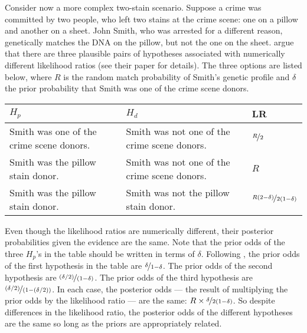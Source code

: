 \documentclass{article}
\begin{document}
Consider now a more complex two-stain scenario. Suppose a crime was committed by two people, who left two stains at the crime scene: one on a pillow and another on a sheet. John Smith, who was arrested for a different reason, genetically matches the DNA on the pillow, but not the one on the sheet. %
\cite{meester2004WhyEffectPriora} argue that there are  three plausible pairs of hypotheses associated with numerically different likelihood ratios (see their paper for details). The three options are listed below, where $R$ is the random match probability of Smith's genetic profile and $\delta$ the prior probability that Smith was one of the crime scene donors.
%
\begin{center}
	\footnotesize
	\begin{tabular}{@{}p{5cm}p{5cm}l@{}}
		\toprule
		$H_p$ & $H_d$  & LR \\ \midrule
		Smith was one of the crime scene donors.   &  Smith was not one of the crime scene donors. & $\nicefrac{R}{2}$   \\
		Smith was the pillow stain donor.     & Smith was not one of the crime scene donors.& $R$\\
		Smith was the pillow stain donor. & Smith was not the pillow stain donor. &  $\nicefrac{R(2-\delta)}{2(1-\delta)}$
		\\ \bottomrule
	\end{tabular}
\end{center}
\normalsize

\noindent

%
%
Even though the likelihood ratios are numerically different, their posterior probabilities given the evidence are the same. Note that the prior odds of the three $H_p$'s in the table should be written in terms of $\delta$. Following  \cite{meester2004WhyEffectPriora},
 the prior odds of the first hypothesis in the table are  $\nicefrac{\delta}{1-\delta}$. The prior odds of the second hypothesis are  $\nicefrac{(\delta/2)}{(1-\delta)}$. The prior odds of the third  hypothesis are $\nicefrac{(\delta/2)}{(1-(\delta/2))}$. In each case, the posterior odds --- the result of multiplying the prior odds by the likelihood ratio --- are the same: $R\times \nicefrac{\delta}{2(1-\delta)}$. So despite differences in the likelihood ratio, the posterior odds of the different hypotheses are the same so long as the priors are appropriately related.
 
\end{document}

